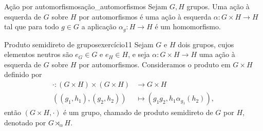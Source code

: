 \begin{definition}{Ação por automorfismos}{ação_automorfismos}
    Sejam \(G, H\) grupos. Uma ação à esquerda de \(G\) sobre \(H\) por automorfismos é uma ação à esquerda \(\alpha : G \times H \to H\) tal que para todo \(g \in G\) a aplicação \(\alpha_{g} : H \to H\) é um homomorfismo.
\end{definition}

\begin{proposition}{Produto semidireto de grupos}{exercício11}
    Sejam \(G\) e \(H\) dois grupos, cujos elementos neutros são \(e_G \in G\) e \(e_H \in H\), e seja \(\alpha : G \times H \to H\) uma ação à esquerda de \(G\) sobre \(H\) por automorfismos. Consideramos o produto em \(G \times H\) definido por
    \begin{align*}
        \cdot : (G \times H) \times (G \times H) &\to G\times H\\
                \left((g_1,h_1),(g_2,h_2)\right) &\mapsto \left(g_1 g_2, h_1 \alpha_{g_1}(h_2)\right),
    \end{align*}
    então \((G \times H, \cdot)\) é um grupo, chamado de produto semidireto de \(G\) por \(H\), denotado por \(G \rtimes_{\alpha} H\).
\end{proposition}
